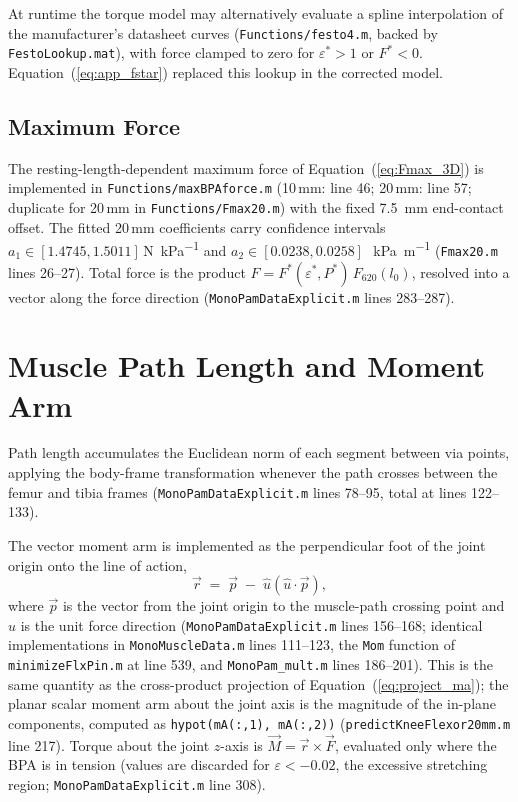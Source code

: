 At runtime the torque model may alternatively evaluate a spline interpolation of the manufacturer's datasheet curves (\texttt{Functions/festo4.m}, backed by \texttt{FestoLookup.mat}), with force clamped to zero for $\varepsilon^{*}>1$ or $F^{*}<0$. Equation~(\ref{eq:app_fstar}) replaced this lookup in the corrected model.

\subsection{Maximum Force}
The resting-length-dependent maximum force of Equation~(\ref{eq:Fmax_3D}) is implemented in \texttt{Functions/maxBPAforce.m} (10\,mm: line 46; 20\,mm: line 57; duplicate for 20\,mm in \texttt{Functions/Fmax20.m}) with the fixed \qty{7.5}{\mm} end-contact offset. The fitted 20\,mm coefficients carry confidence intervals $a_1 \in [1.4745, 1.5011]$\,\si{\N\per\kPa} and $a_2 \in [0.0238, 0.0258]$\,\si{\per\kPa\per\metre} (\texttt{Fmax20.m} lines 26--27). Total force is the product $F = F^{*}(\varepsilon^{*},P^{*})\,F_{620}(l_{0})$, resolved into a vector along the force direction (\texttt{MonoPamDataExplicit.m} lines 283--287).

\section{Muscle Path Length and Moment Arm}

Path length accumulates the Euclidean norm of each segment between via points, applying the body-frame transformation whenever the path crosses between the femur and tibia frames (\texttt{MonoPamDataExplicit.m} lines 78--95, total at lines 122--133).

The vector moment arm is implemented as the perpendicular foot of the joint origin onto the line of action,
\begin{equation}
    \vec{r} \;=\; \vec{p} \;-\; \hat{u}\left(\hat{u}\cdot\vec{p}\right),
    \label{eq:app_perpfoot}
\end{equation}
where $\vec{p}$ is the vector from the joint origin to the muscle-path crossing point and $\hat{u}$ is the unit force direction (\texttt{MonoPamDataExplicit.m} lines 156--168; identical implementations in \texttt{MonoMuscleData.m} lines 111--123, the \texttt{Mom} function of \texttt{minimizeFlxPin.m} at line 539, and \texttt{MonoPam\_mult.m} lines 186--201). This is the same quantity as the cross-product projection of Equation~(\ref{eq:project_ma}); the planar scalar moment arm about the joint axis is the magnitude of the in-plane components, computed as \texttt{hypot(mA(:,1), mA(:,2))} (\texttt{predictKneeFlexor20mm.m} line 217). Torque about the joint $z$-axis is $\vec{M} = \vec{r}\times\vec{F}$, evaluated only where the BPA is in tension (values are discarded for $\varepsilon < -0.02$, the excessive stretching region; \texttt{MonoPamDataExplicit.m} line 308).

